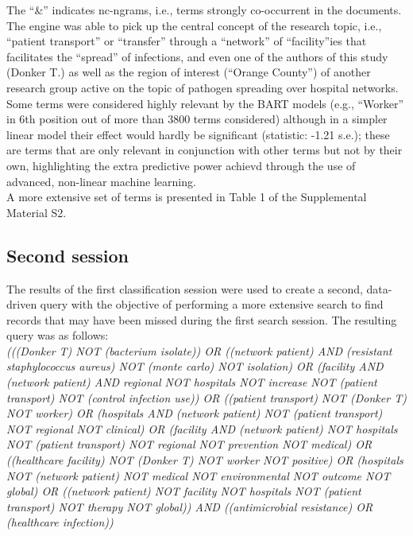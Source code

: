 \documentclass{article}
\begin{document}
The ``\&'' indicates nc-ngrams, i.e., terms strongly co-occurrent in the
documents.\\
The engine was able to pick up the central concept of the research
topic, i.e., ``patient transport'' or ``transfer'' through a ``network''
of ``facility''ies that facilitates the ``spread'' of infections, and
even one of the authors of this study (Donker T.) as well as the region
of interest (``Orange County'') of another research group active on the
topic of pathogen spreading over hospital networks. Some terms were
considered highly relevant by the BART models (e.g., ``Worker'' in 6th
position out of more than 3800 terms considered) although in a simpler
linear model their effect would hardly be significant (statistic: -1.21
s.e.); these are terms that are only relevant in conjunction with other
terms but not by their own, highlighting the extra predictive power
achievd through the use of advanced, non-linear machine learning.\\
A more extensive set of terms is presented in Table 1 of the
Supplemental Material S2.

\hypertarget{second-session}{%
\subsection{Second session}\label{second-session}}

The results of the first classification session were used to create a
second, data-driven query with the objective of performing a more
extensive search to find records that may have been missed during the
first search session. The resulting query was as follows:\\

\emph{(((Donker T) NOT (bacterium isolate)) OR ((network patient) AND
(resistant staphylococcus aureus) NOT (monte carlo) NOT isolation) OR
(facility AND (network patient) AND regional NOT hospitals NOT increase
NOT (patient transport) NOT (control infection use)) OR ((patient
transport) NOT (Donker T) NOT worker) OR (hospitals AND (network
patient) NOT (patient transport) NOT regional NOT clinical) OR (facility
AND (network patient) NOT hospitals NOT (patient transport) NOT regional
NOT prevention NOT medical) OR ((healthcare facility) NOT (Donker T) NOT
worker NOT positive) OR (hospitals NOT (network patient) NOT medical NOT
environmental NOT outcome NOT global) OR ((network patient) NOT facility
NOT hospitals NOT (patient transport) NOT therapy NOT global)) AND
((antimicrobial resistance) OR (healthcare infection))}
\end{document}
